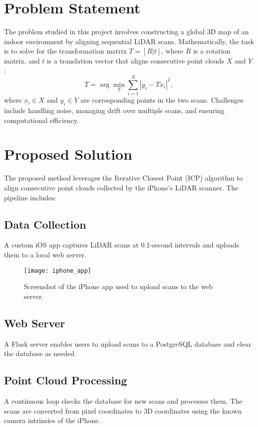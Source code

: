 \documentclass[conference]{IEEEtran}
\begin{document}
    \section{Problem Statement}
    The problem studied in this project involves constructing a global
    3D map of an indoor environment by aligning sequential LiDAR scans.
    Mathematically, the task is to solve for the transformation matrix $T = [R|t]$, where $R$
    is a rotation matrix, and $t$ is a translation vector that aligns consecutive point clouds
    $X$ and $Y$: \begin{equation} T = \arg\min_T \sum_{i=1}^N |y_i - T x_i|^2, \end{equation}
    where $x_i \in X$ and $y_i \in Y$ are corresponding points in the two scans.
    Challenges include handling noise, managing drift over multiple scans, and ensuring computational efficiency.

    \section{Proposed Solution}
    The proposed method leverages the Iterative Closest Point (ICP) algorithm to align consecutive
    point clouds collected by the iPhone's LiDAR scanner.
    The pipeline includes:

    \subsection{Data Collection}
    A custom iOS app captures LiDAR scans at 0.1-second intervals and uploads them to a local web server.

    \begin{figure}[htbp]
        \centering
        \texttt{[image: iphone\_app]}
        \caption{Screenshot of the iPhone app used to upload scans to the web server.}
        \label{fig:iphone_app}
    \end{figure}

    \subsection{Web Server}
    A Flask server enables users to upload scans to a PostgreSQL database and clear the database as needed.

    \subsection{Point Cloud Processing}
    A continuous loop checks the database for new scans and processes them.
    The scans are converted from pixel coordinates to 3D coordinates using the known camera intrinsics of the iPhone.
\end{document}
